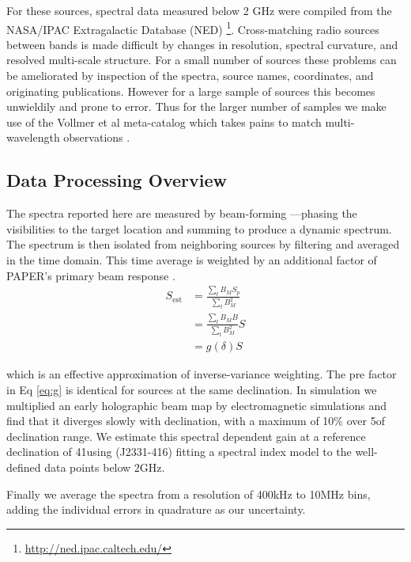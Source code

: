 \documentclass[preprint]{aastex}
\begin{document}
For these sources, spectral data measured below 2 GHz were compiled from 
the NASA/IPAC Extragalactic Database (NED)
\footnote{\url{http://ned.ipac.caltech.edu/}}. Cross-matching radio sources
between bands is made difficult by changes in resolution, spectral curvature,
and resolved multi-scale structure.  For a small number of sources these
problems can be ameliorated by inspection of the spectra, source names,
coordinates,  and originating publications. However for a large sample of
sources this becomes unwieldily and prone to error. Thus for the larger number
of samples we make use of the Vollmer et al meta-catalog which takes pains to
match multi-wavelength observations \citep{Vollmer:2010p6422}.

\subsection*{Data Processing Overview}
\label{sec:data_overview}
The spectra reported here are measured by beam-forming ---phasing the visibilities to
the target location and summing to produce a dynamic spectrum. The spectrum is then isolated
from neighboring sources by filtering and averaged in the time domain.  This time average is 
weighted by an additional factor of PAPER's primary beam response 
\citep{Pober:2012p8800}.  
\begin{align}
S_\textrm{est} &= \frac{\sum_t B_M S_p}{\sum_t B^2_M} \nonumber \\ 
&= \frac{\sum_t B_M B}{\sum_t B^2_M} S  \nonumber \\
&= g(\delta) S  \label{eq:g}
\end{align}

which is an effective approximation of inverse-variance weighting. The pre factor in Eq \ref{eq:g} is identical for 
sources at the same declination.  In simulation we multiplied an early holographic beam map \cite{Pober:2012p8800}
by electromagnetic simulations and find that it 
diverges slowly with declination, with a maximum of 10\% over 5\arcdeg of declination range.
We estimate this spectral dependent gain at a reference declination of 41\arcmin using (J2331-416) fitting a spectral index model to the
 well-defined data points below 2GHz. 
 
 Finally we average the spectra from a resolution of 400kHz to 10MHz bins, adding the individual errors in quadrature
 as our uncertainty.
\end{document}
